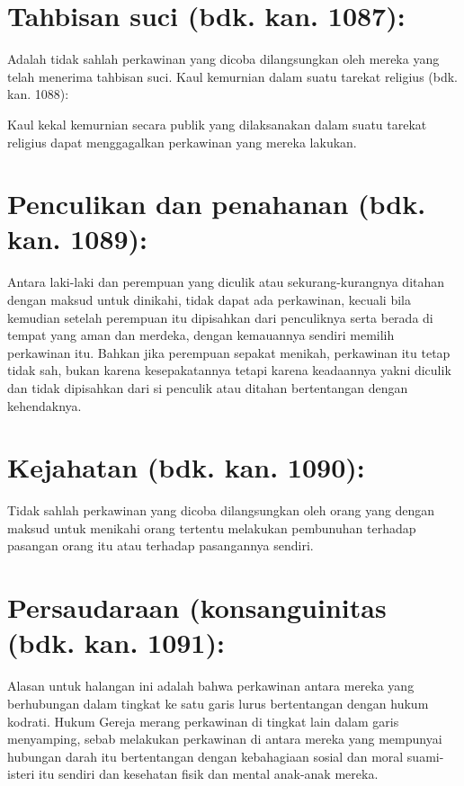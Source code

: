 \section{Tahbisan suci (bdk. kan. 1087):}

Adalah tidak sahlah perkawinan yang dicoba dilangsungkan oleh mereka yang telah menerima tahbisan suci.
Kaul kemurnian dalam suatu tarekat religius (bdk. kan. 1088):

Kaul kekal kemurnian secara publik yang dilaksanakan dalam suatu tarekat religius dapat menggagalkan perkawinan yang mereka lakukan.

\section{Penculikan dan penahanan (bdk. kan. 1089):}

Antara laki-laki dan perempuan yang diculik atau sekurang-kurangnya ditahan dengan maksud untuk dinikahi, tidak dapat ada perkawinan, kecuali bila kemudian setelah perempuan itu dipisahkan dari penculiknya serta berada di tempat yang aman dan merdeka, dengan kemauannya sendiri memilih perkawinan itu. Bahkan jika perempuan sepakat menikah, perkawinan itu tetap tidak sah, bukan karena kesepakatannya tetapi karena keadaannya yakni diculik dan tidak dipisahkan dari si penculik atau ditahan bertentangan dengan kehendaknya.

\section{Kejahatan (bdk. kan. 1090):}

Tidak sahlah perkawinan yang dicoba dilangsungkan oleh orang yang dengan maksud untuk menikahi orang tertentu melakukan pembunuhan terhadap pasangan orang itu atau terhadap pasangannya sendiri.

\section{Persaudaraan (konsanguinitas (bdk. kan. 1091):}

Alasan untuk halangan ini adalah bahwa perkawinan antara mereka yang berhubungan dalam tingkat ke satu  garis lurus bertentangan dengan hukum kodrati. Hukum Gereja merang perkawinan di tingkat lain dalam garis menyamping, sebab melakukan perkawinan di antara mereka yang mempunyai hubungan darah itu bertentangan dengan kebahagiaan sosial dan moral suami-isteri itu sendiri dan kesehatan fisik dan mental anak-anak mereka.

